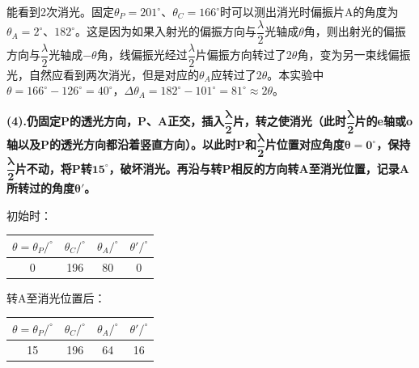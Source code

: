 \documentclass[a4paper,fontset=windows]{ctexart}
\begin{document}
{能看到2次消光。固定$\theta_P = 201^\circ$、$\theta_C = 166^\circ$时可以测出消光时偏振片A的角度为$\theta_A = 2^\circ$、$182^\circ$。这是因为如果入射光的偏振方向与$\dfrac{\lambda}{2}$光轴成$\theta$角，则出射光的偏振方向与$\dfrac{\lambda}{2}$光轴成$-\theta$角，线偏振光经过$\dfrac{\lambda}{2}$片偏振方向转过了$2\theta$角，变为另一束线偏振光，自然应看到两次消光，但是对应的$\theta_A$应转过了$2\theta$。本实验中$\theta = 166^\circ - 126^\circ = 40^\circ$，$\Delta\theta_A = 182^\circ - 101^\circ = 81^\circ \approx 2\theta$。

\bigskip
\textbf{(4).仍固定P的透光方向，P、A正交，插入$\boldsymbol{\dfrac{\lambda}{2}}$片，转之使消光（此时$\boldsymbol{\dfrac{\lambda}{2}}$片的e轴或o轴以及P的透光方向都沿着竖直方向）。以此时P和$\boldsymbol{\dfrac{\lambda}{2}}$片位置对应角度$\boldsymbol{\theta = 0^\circ}$，保持$\boldsymbol{\dfrac{\lambda}{2}}$片不动，将P转$\boldsymbol{15^\circ}$，破坏消光。再沿与转P相反的方向转A至消光位置，记录A所转过的角度$\boldsymbol{\theta'}$。}

初始时：

\vspace{0.5em}
\begin{table}[ht!]\linespread{1.2}\selectfont
    \begin{center}
        \begin{tabular}{ |c|c|c|c| }
        \hline
        $\theta = \theta_P/^\circ$ & $\theta_C/^\circ$ & $\theta_A/^\circ$ & $\theta'/^\circ$ \\
        \hline
        0 & 196 & 80 & 0 \\
        \hline
        \end{tabular}
    \end{center}
\end{table}\vspace{-0.5em}

转A至消光位置后：

\vspace{0.5em}
\begin{table}[ht!]\linespread{1.2}\selectfont
    \begin{center}
        \begin{tabular}{ |c|c|c|c| }
            \hline
            $\theta = \theta_P/^\circ$ & $\theta_C/^\circ$ & $\theta_A/^\circ$ & $\theta'/^\circ$ \\
            \hline
            15 & 196 & 64 & 16 \\
            \hline
        \end{tabular}
    \end{center}
\end{table}\vspace{-0.5em}

}
\end{document}
